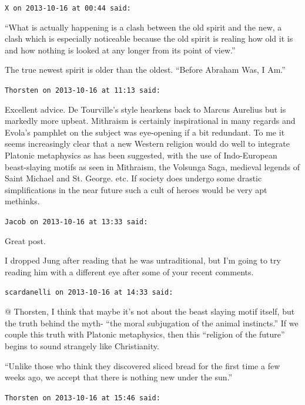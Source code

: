 \begin{footnotesize}
\begin{sffamily}
\texttt{X on 2013-10-16 at 00:44 said:}

``What is actually happening is a clash between the old spirit and the new, a clash which is especially noticeable because the old spirit is realing how old it is and how nothing is looked at any longer from its point of view.''

The true newest spirit is older than the oldest. ``Before Abraham Was, I Am.''

\hfill

\texttt{Thorsten on 2013-10-16 at 11:13 said:}

Excellent advice. De Tourville's style hearkens back to Marcus Aurelius but is markedly more upbeat. Mithraism is certainly inspirational in many regards and Evola's pamphlet on the subject was eye-opening if a bit redundant. To me it seems increasingly clear that a new Western religion would do well to integrate Platonic metaphysics as has been suggested, with the use of Indo-European beast-slaying motifs as seen in Mithraism, the Volsunga Saga, medieval legends of Saint Michael and St. George. etc. If society does undergo some drastic simplifications in the near future such a cult of heroes would be very apt methinks.

\hfill

\texttt{Jacob on 2013-10-16 at 13:33 said:}

Great post.

I dropped Jung after reading that he was untraditional, but I'm going to try reading him with a different eye after some of your recent comments.

\hfill

\texttt{scardanelli on 2013-10-16 at 14:33 said:}

@ Thorsten, I think that maybe it's not about the beast slaying motif itself, but the truth behind the myth- ``the moral subjugation of the animal instincts.'' If we couple this truth with Platonic metaphysics, then this ``religion of the future'' begins to sound strangely like Christianity.

``Unlike those who think they discovered sliced bread for the first time a few weeks ago, we accept that there is nothing new under the sun.''

\hfill

\texttt{Thorsten on 2013-10-16 at 15:46 said:}


\end{sffamily}
\end{footnotesize}
